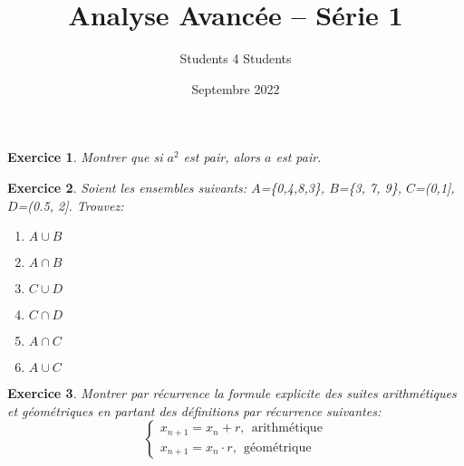 \documentclass{article}
\title{\textbf{Analyse Avancée -- Série 1}}
\author{Students 4 Students}
\date{Septembre 2022}
\theoremstyle{exercice}
\newtheorem{exercice}{Exercice}
\begin{document}
\pagestyle{fancy}

\maketitle


\begin{exercice}
Montrer que si $a^2$ est pair, alors $a$ est pair.
\end{exercice}

\begin{exercice}
    Soient les ensembles suivants: $A$=\{0,4,8,3\}, $B$=\{3, 7, 9\}, $C$=(0,1], $D$=(0.5, 2].
Trouvez:

\begin{enumerate}
    \item $A\cup B$
    \item $A \cap B$
    \item $C\cup D$
    \item $C\cap D$
    \item $A\cap C$
    \item $A\cup C$
\end{enumerate}

\end{exercice}

\begin{exercice}
Montrer par récurrence la formule explicite des suites arithmétiques et géométriques en partant des définitions par récurrence suivantes:
\begin{equation}
    \begin{cases}
        x_{n+1}=x_n+r, ~~\text{arithmétique}\\
        x_{n+1}=x_n\cdot r, ~~\text{géométrique}
    \end{cases}
\end{equation}

    
\end{exercice}
\end{document}
